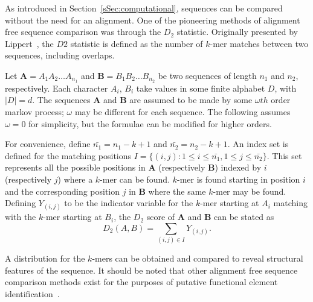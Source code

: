 



As introduced in Section~\ref{sSec:computational}, sequences can be compared without the need for an alignment. 
One of the pioneering methods of alignment free sequence comparison was through the $D_2$ statistic. Originally presented by Lippert~\cite{lippert2002distributional}, the $D2$ statistic is defined as the number of $k$-mer matches between two sequences, including overlaps.


Let $\mathbf{A} = A_1A_2\ldots A_{n_1}$ and $\mathbf{B}=B_1B_2\ldots B_{n_2}$ be two sequences of length $n_1$ and $n_2$, respectively. Each character $A_i,\,B_i$ take values in some finite alphabet $D$, with $|D| = d$.  The sequences $\mathbf{A}$ and $\mathbf{B}$ are assumed to be made by some $\omega th$ order markov process; $\omega$ may be different for each sequence. The following assumes $\omega = 0$ for simplicity, but the formulae can be modified for higher orders. 

For convenience, define $\bar{n_1} = n_1 - k + 1$ and $\bar{n_2} = n_2 - k + 1$. An index set is defined for the matching positions $I = \{(i,j): 1 \leq i \leq \bar{n_1}, 1 \leq j \leq \bar{n_2}\}$. This set represents all the possible positions in $\mathbf{A}$ (respectively $\mathbf{B}$) indexed by $i$ (respectively $j$) where a $k$-mer can be found. 
 $k$-mer is found starting in position $i$ and the corresponding position $j$ in $\mathbf{B}$ where the same $k$-mer may be found. 
Defining $Y_{(i,j)}$ to be the indicator variable for the $k$-mer starting at $A_i$ matching with the $k$-mer starting at $B_i$, the $D_2$ score of $\mathbf{A}$ and $\mathbf{B}$ can be stated as 
	\begin{equation}
		D_2(A,B) = \sum_{(i,j)\in I }Y_{(i,j)}.\label{eqn:AF}
	\end{equation}

A distribution for the $k$-mers can be obtained and compared to reveal structural features of the sequence. It should be noted that other alignment free sequence comparison methods exist for the purposes of putative functional element identification~\cite{arunachalam2010alignment, kantorovitz2007statistical, reinert2009alignment, wang2013cpat}. 

